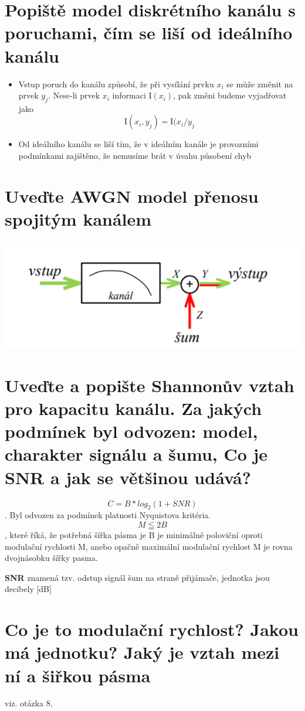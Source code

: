 \section{Popiště model diskrétního kanálu s poruchami, čím se liší od ideálního kanálu}
\begin{itemize}
    \item Vstup poruch do kanálu způsobí, že při vysílání prvku $x_i$ se může změnit na prvek $y_j$.
    Nese-li prvek $x_i$ informaci I$(x_i)$, pak změni budeme vyjadřovat jako
    $$\mathrm{I}(x_i, y_j) = \mathrm{I}(x_i / y_j$$
    \item Od ideálního kanálu se liší tím, že v ideálním kanále je provozními podmínkami zajištěno, že nemusíme brát v úvahu působení chyb
\end{itemize}

\section{Uveďte AWGN model přenosu spojitým kanálem}
\includegraphics[]{images/AWGN.png}

\section{Uveďte a popište Shannonův vztah pro kapacitu kanálu. Za jakých podmínek byl odvozen: model, charakter signálu a šumu, Co je SNR a jak se většinou udává?}
$$C = B*log_2(1+SNR)$$.
Byl odvozen za podmínek platnosti Nyquistova kritéria.
$$M \leqq 2B$$, které říká, že potřebná šířka pásma je B je minimálně poloviční oproti modulační rychlosti M, anebo opačně maximální modulační rychlost M je rovna dvojnásobku šířky pasma.

\textbf{SNR} znamená tzv. odstup signál šum na straně přijámače, jednotka jsou decibely [dB]

\section{Co je to modulační rychlost? Jakou má jednotku? Jaký je vztah mezi ní a šiřkou pásma}
viz. otázka 8.

